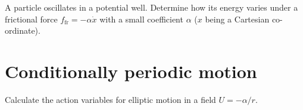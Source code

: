 
\begin{problem}[title={Energy of an oscillator under weak friction}]
{
A particle oscillates in a potential well. Determine how its energy varies under a frictional force $f_{\text{fr}} = -\alpha \Dot{x}$ with a small coefficient $\alpha$ ($x$ being a Cartesian co-ordinate).
}
{}
{}
\end{problem}

\section{Conditionally periodic motion}


\begin{problem}[title={Action variables for elliptic Kepler motion}]
{
Calculate the action variables for elliptic motion in a field $U = -\alpha/r$.
}
{}
{}
\end{problem}
